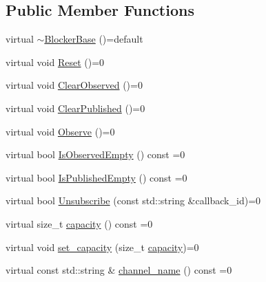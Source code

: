 \subsection*{Public Member Functions}
\begin{DoxyCompactItemize}
\item 
virtual \hyperlink{classapollo_1_1cyber_1_1blocker_1_1BlockerBase_a101aef7ac0d785ae7b622356c73c9a00}{$\sim$\-Blocker\-Base} ()=default
\item 
virtual void \hyperlink{classapollo_1_1cyber_1_1blocker_1_1BlockerBase_a32fd8d73c7d5a5e4e2521f95126934d4}{Reset} ()=0
\item 
virtual void \hyperlink{classapollo_1_1cyber_1_1blocker_1_1BlockerBase_aa644c34503729364e5742f36f4246469}{Clear\-Observed} ()=0
\item 
virtual void \hyperlink{classapollo_1_1cyber_1_1blocker_1_1BlockerBase_a79270e6fab5378d6b40162fb4322d189}{Clear\-Published} ()=0
\item 
virtual void \hyperlink{classapollo_1_1cyber_1_1blocker_1_1BlockerBase_ad14b2e2e37c4436f2ef72e78505aa271}{Observe} ()=0
\item 
virtual bool \hyperlink{classapollo_1_1cyber_1_1blocker_1_1BlockerBase_ae362222ab521ba70e034c41a602a2f28}{Is\-Observed\-Empty} () const =0
\item 
virtual bool \hyperlink{classapollo_1_1cyber_1_1blocker_1_1BlockerBase_a38759de3825c1768af583bebe334aaf1}{Is\-Published\-Empty} () const =0
\item 
virtual bool \hyperlink{classapollo_1_1cyber_1_1blocker_1_1BlockerBase_a8fd56887517c5015e32cd96544cd2d6a}{Unsubscribe} (const std\-::string \&callback\-\_\-id)=0
\item 
virtual size\-\_\-t \hyperlink{classapollo_1_1cyber_1_1blocker_1_1BlockerBase_a4b38e9b2314553bfd14edc8c0f80806d}{capacity} () const =0
\item 
virtual void \hyperlink{classapollo_1_1cyber_1_1blocker_1_1BlockerBase_aa3db5ee03360d7d645dad38c0352e4e6}{set\-\_\-capacity} (size\-\_\-t \hyperlink{classapollo_1_1cyber_1_1blocker_1_1BlockerBase_a4b38e9b2314553bfd14edc8c0f80806d}{capacity})=0
\item 
virtual const std\-::string \& \hyperlink{classapollo_1_1cyber_1_1blocker_1_1BlockerBase_aa9606bd0d65712dfd8c62bee4db5180b}{channel\-\_\-name} () const =0
\end{DoxyCompactItemize}


